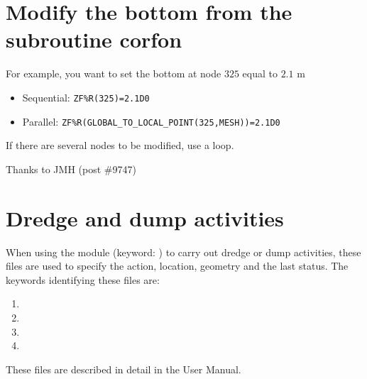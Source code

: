 \section{Modify the bottom from the subroutine corfon}
For example, you want to set the bottom at node $325$ equal to $2.1$ m
\begin{itemize}
\item Sequential: \texttt{ZF\%R(325)=2.1D0}
\item Parallel: \texttt{ZF\%R(GLOBAL\_TO\_LOCAL\_POINT(325,MESH))=2.1D0}
\end{itemize}

If there are several nodes to be modified, use a loop.

{\footnotesize Thanks to JMH (post \#9747)}

\section{Dredge and dump activities}
When using the module \nestor (keyword: ) to carry out dredge or dump activities, these files are used to
specify the action, location, geometry and the last status. The keywords identifying these files are:

\begin{enumerate}
\item  {}

\item  {}

\item  {}

\item  {}
\end{enumerate}

These files are described in detail in the \nestor User Manual.






